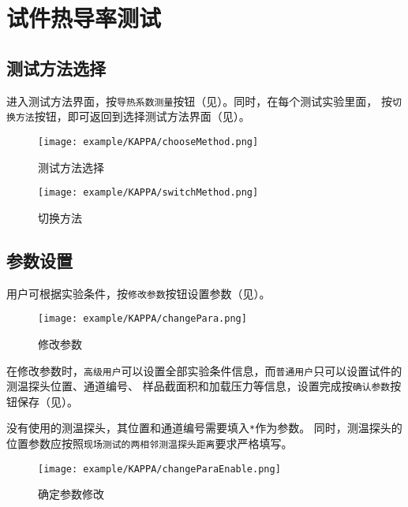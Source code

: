 \section{试件热导率测试}
\subsection{测试方法选择}
进入测试方法界面，按\lstinline{导热系数测量}按钮（见）。同时，在每个测试实验里面，
按\lstinline{切换方法}按钮，即可返回到选择测试方法界面（见）。
\begin{figure}[htbp]
	\centering
	\texttt{[image: example/KAPPA/chooseMethod.png]}
	\caption{ 测试方法选择 \label{fig:exmp_kappa_chooseMethod}}
\end{figure}

\begin{figure}[htbp]
	\centering
	\texttt{[image: example/KAPPA/switchMethod.png]}
	\caption{ 切换方法 \label{fig:exmp_kappa_switchMethod}}
\end{figure}

\subsection{参数设置}
用户可根据实验条件，按\lstinline{修改参数}按钮设置参数（见）。
\begin{figure}[htbp]
	\centering
	\texttt{[image: example/KAPPA/changePara.png]}
	\caption{ 修改参数 \label{fig:exmp_kappa_changePara}}
\end{figure}
在修改参数时，\lstinline{高级用户}可以设置全部实验条件信息，而\lstinline{普通用户}只可以设置试件的测温探头位置、通道编号、
样品截面积和加载压力等信息，设置完成按\lstinline{确认参数}按钮保存（见）。
\begin{note}
没有使用的测温探头，其位置和通道编号需要填入\lstinline{*}作为参数。
同时，测温探头的位置参数应按照\lstinline{现场测试的两相邻测温探头距离}要求严格填写。
\end{note}
\begin{figure}[htbp]
	\centering
	\texttt{[image: example/KAPPA/changeParaEnable.png]}
	\caption{ 确定参数修改 \label{fig:exmp_kappa_changeParaEnable}}
\end{figure}
~\\

